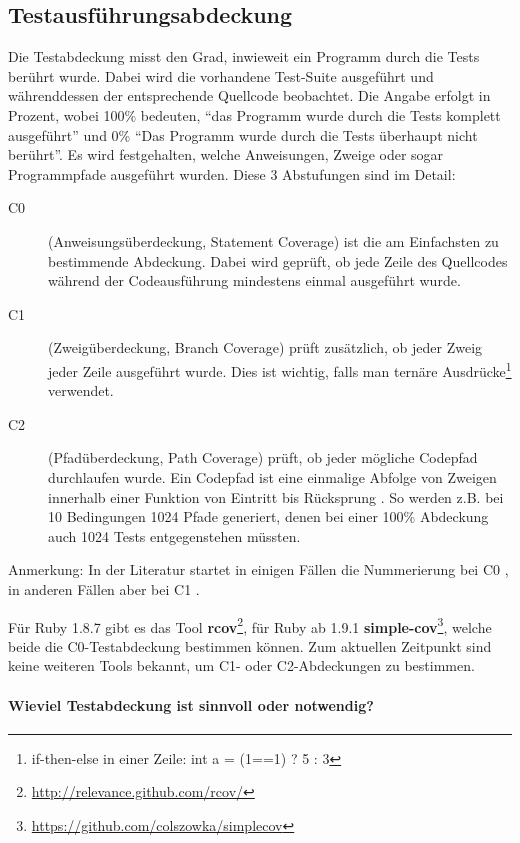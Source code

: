 \subsection{Testausführungsabdeckung}
\label{sec:coverage}
Die Testabdeckung misst den Grad, inwieweit ein Programm durch die Tests berührt wurde. Dabei wird die vorhandene Test-Suite ausgeführt und währenddessen der entsprechende Quellcode beobachtet. Die Angabe erfolgt in Prozent, wobei 100\% bedeuten, "`das Programm wurde durch die Tests komplett ausgeführt"' und 0\% "`Das Programm wurde durch die Tests überhaupt nicht berührt"'.  Es wird festgehalten, welche Anweisungen, Zweige oder sogar Programmpfade ausgeführt wurden. Diese 3 Abstufungen sind im Detail:
\begin{description}
 \item[C0] (Anweisungsüberdeckung, Statement Coverage) ist die am Einfachsten zu bestimmende Abdeckung. Dabei wird geprüft, ob jede Zeile des Quellcodes während der Codeausführung mindestens einmal ausgeführt wurde.
 \item[C1] (Zweigüberdeckung, Branch Coverage) prüft zusätzlich, ob jeder Zweig jeder Zeile ausgeführt wurde. Dies ist wichtig, falls man ternäre Ausdrücke\footnote{if-then-else in einer Zeile: int a = (1==1) ? 5 : 3} verwendet.
 \item[C2] (Pfadüberdeckung, Path Coverage) prüft, ob jeder mögliche Codepfad durchlaufen wurde. Ein Codepfad ist eine einmalige Abfolge von Zweigen innerhalb einer Funktion von Eintritt bis Rücksprung \citep{steve_cornett_code_1996}. So werden z.B. bei 10 Bedingungen 1024 Pfade generiert, denen bei einer 100\% Abdeckung auch 1024 Tests entgegenstehen müssten.
 \end{description}
 Anmerkung: In der Literatur startet in einigen Fällen die Nummerierung bei C0 \citep{catherine_powell_abakas_2008}, in anderen Fällen aber bei C1 \citep{steve_cornett_code_1996}.

 Für Ruby 1.8.7 gibt es das Tool \textbf{rcov}\footnote{\url{http://relevance.github.com/rcov/}}, für Ruby ab 1.9.1 \textbf{simple-cov}\footnote{\url{https://github.com/colszowka/simplecov}}, welche beide die C0-Testabdeckung bestimmen können. Zum aktuellen Zeitpunkt sind keine weiteren Tools bekannt, um C1- oder C2-Abdeckungen zu bestimmen.
 \paragraph{Wieviel Testabdeckung ist sinnvoll oder notwendig?}

